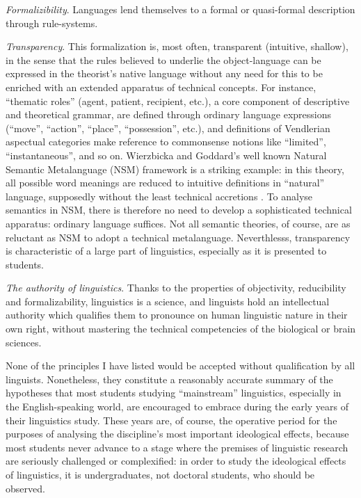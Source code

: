 \documentclass[output=paper]{langscibook}
\begin{document}
\emph{Formalizibility}. Languages lend themselves to a formal or quasi-formal description through rule-systems.

\emph{Transparency}. This formalization is, most often, transparent (intuitive, shallow), in the sense that the rules believed to underlie the object-language can be expressed in the theorist's native language without any need for this to be enriched with an extended apparatus of technical concepts. For instance, ``thematic roles'' (agent, patient, recipient, etc.), a core component of descriptive and theoretical grammar, are defined through ordinary language expressions (``move'', ``action'', ``place'', ``possession'', etc.), and definitions of Vendlerian aspectual categories make reference to commonsense notions like ``limited'', ``instantaneous'', and so on. Wierzbicka and Goddard's well known Natural Semantic Metalanguage (NSM) framework is a striking example: in this theory, all possible word meanings are reduced to intuitive definitions in ``natural'' language, supposedly without the least technical accretions \citep[see][]{Wierzbicka1996}. To analyse semantics in NSM, there is therefore no need to develop a sophisticated technical apparatus: ordinary language suffices. Not all semantic theories, of course, are as reluctant as NSM to adopt a technical metalanguage. Neverthlesss, transparency is characteristic of a large part of linguistics, especially as it is presented to students.

\emph{The authority of linguistics}. Thanks to the properties of objectivity, reducibility and formalizability, linguistics is a science, and linguists hold an intellectual authority which qualifies them to pronounce on human linguistic nature in their own right, without mastering the technical competencies of the biological or brain sciences.

None of the principles I have listed would be accepted without qualification by all linguists. Nonetheless, they constitute a reasonably accurate summary of the hypotheses that most students studying ``mainstream'' linguistics, especially in the English-speaking world, are encouraged to embrace during the early years of their linguistics study. These years are, of course, the operative period for the purposes of analysing the discipline's most important ideological effects, because most students never advance to a stage where the premises of linguistic research are seriously challenged or complexified: in order to study the ideological effects of linguistics, it is undergraduates, not doctoral students, who should be observed.
\end{document}
